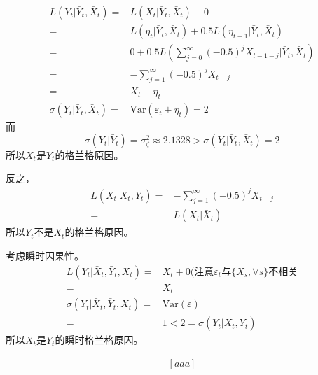 \documentclass[
]{book}
\theoremstyle{definition}
\theoremstyle{definition}
\theoremstyle{definition}
\theoremstyle{definition}
\theoremstyle{remark}
\begin{document}
\[\begin{aligned}
L(Y_t | \bar Y_t, \bar X_t)
=& L(X_t | \bar Y_t, \bar X_t) + 0 \\
=& L(\eta_t | \bar Y_t, \bar X_t)
+ 0.5 L(\eta_{t-1} | \bar Y_t, \bar X_t) \\
=& 0 + 0.5 L(\sum_{j=0}^\infty (-0.5)^j X_{t-1-j} | \bar Y_t, \bar X_t) \\
=& - \sum_{j=1}^\infty (-0.5)^j X_{t-j} \\
=& X_t - \eta_t \\
\sigma(Y_t | \bar Y_t, \bar X_t) 
=& \text{Var}(\varepsilon_t + \eta_t) = 2
\end{aligned}\]
而
\[
\sigma(Y_t | \bar Y_t)
= \sigma^2_\zeta \approx 2.1328
> \sigma(Y_t | \bar Y_t, \bar X_t) = 2
\]
所以\(X_t\)是\(Y_t\)的格兰格原因。

反之，
\[\begin{aligned}
L(X_t | \bar X_t, \bar Y_t)
=& - \sum_{j=1}^\infty (-0.5)^j X_{t-j} \\
=& L(X_t | \bar X_t)
\end{aligned}\]
所以\(Y_t\)不是\(X_t\)的格兰格原因。

考虑瞬时因果性。
\[\begin{aligned}
L(Y_t | \bar X_t, \bar Y_t, X_t)
=& X_{t} + 0 (\text{注意}\varepsilon_t\text{与}\{X_s, \forall s\}\text{不相关} \\
=& X_t \\
\sigma(Y_t | \bar X_t, \bar Y_t, X_t)
=& \text{Var}(\varepsilon) \\
=& 1 < 2 = \sigma(Y_t | \bar X_t, \bar Y_t)
\end{aligned}\]
所以\(X_t\)是\(Y_t\)的瞬时格兰格原因。

\[\begin{aligned}
[aaa]
\end{aligned}\]

\printbibliography
\end{document}
